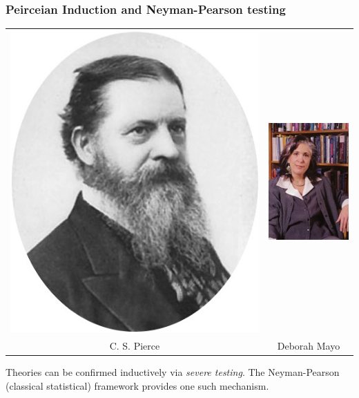\documentclass{beamer}
\begin{document}
\begin{frame}
\frametitle{Peirceian Induction and Neyman-Pearson testing}
\begin{center}
\begin{tabular}{cc}
\includegraphics[scale = 0.3]{peirce.jpg} &
\includegraphics[scale = 0.8]{dmayo1.jpg} \\
C. S. Pierce & Deborah Mayo
\end{tabular}
\end{center}
Theories can be confirmed inductively via \emph{severe testing}.  The Neyman-Pearson (classical statistical) framework provides one such mechanism.
\end{frame}
\end{document}
